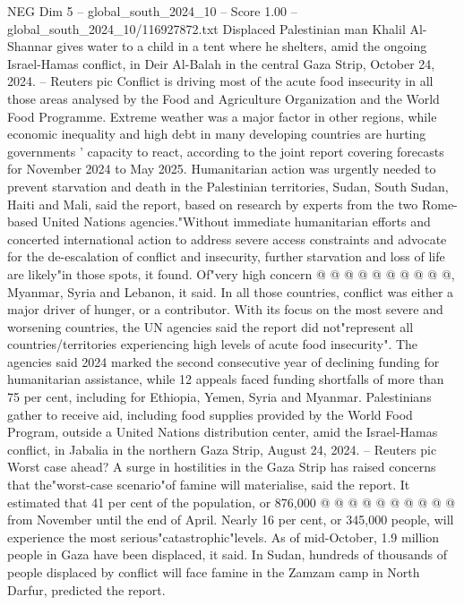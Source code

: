 \begin{textsample}{NEG Dim 5 – global\_south\_2024\_10 – Score 1.00 – global\_south\_2024\_10/116927872.txt}  \label{ex:f5_neg_139}
Displaced Palestinian man Khalil Al-Shannar gives water to a child in a tent where he shelters, amid the ongoing Israel-Hamas conflict, in Deir Al-Balah in the central Gaza Strip, October 24, 2024. -- Reuters pic Conflict is driving most of the acute food insecurity in all those areas analysed by the Food and Agriculture Organization and the World Food Programme.
Extreme weather was a major factor in other regions, while economic inequality and high debt in many developing countries are hurting governments ' capacity to react, according to the joint report covering forecasts for November 2024 to May 2025.
Humanitarian action was urgently needed to prevent starvation and death in the Palestinian territories, Sudan, South Sudan, Haiti and Mali, said the report, based on research by experts from the two Rome-based United Nations agencies."Without immediate humanitarian efforts and concerted international action to address severe access constraints and advocate for the de-escalation of conflict and insecurity, further starvation and loss of life are likely"in those spots, it found.
Of"very high concern @ @ @ @ @ @ @ @ @ @, Myanmar, Syria and Lebanon, it said.
In all those countries, conflict was either a major driver of hunger, or a contributor.
With its focus on the most severe and worsening countries, the UN agencies said the report did not"represent all countries/territories experiencing high levels of acute food insecurity".
The agencies said 2024 marked the second consecutive year of declining funding for humanitarian assistance, while 12 appeals faced funding shortfalls of more than 75 per cent, including for Ethiopia, Yemen, Syria and Myanmar.
Palestinians gather to receive aid, including food supplies provided by the World Food Program, outside a United Nations distribution center, amid the Israel-Hamas conflict, in Jabalia in the northern Gaza Strip, August 24, 2024. -- Reuters pic Worst case ahead?
A surge in hostilities in the Gaza Strip has raised concerns that the"worst-case scenario"of famine will materialise, said the report.
It estimated that 41 per cent of the population, or 876,000 @ @ @ @ @ @ @ @ @ @ from November until the end of April.
Nearly 16 per cent, or 345,000 people, will experience the most serious"catastrophic"levels.
As of mid-October, 1.9 million people in Gaza have been displaced, it said.
In Sudan, hundreds of thousands of people displaced by conflict will face famine in the Zamzam camp in North Darfur, predicted the report.

\end{textsample}
